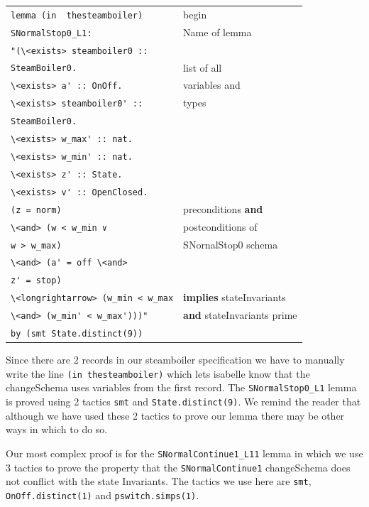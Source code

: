 \noindent \begin{tabular}{|l | l|}
\hline
\verb|lemma (in  thesteamboiler)| & {\color{red}begin} \\
\verb|SNormalStop0_L1:|& {\color{red}Name of lemma} \\
\verb|"(\<exists> steamboiler0 :: | & \\
\verb|SteamBoiler0.|&  {\color{red}list of all} \\
\verb|\<exists> a' :: OnOff.|&  {\color{red}variables and} \\
\verb|\<exists> steamboiler0' :: | & {\color{red}types} \\
\verb|SteamBoiler0.|&  \\
\verb|\<exists> w_max' :: nat.|&  \\
\verb|\<exists> w_min' :: nat.|&  \\
\verb|\<exists> z' :: State.|&  \\
\verb|\<exists> v' :: OpenClosed.|&  \\
\verb|(z = norm)|&  {\color{red}preconditions \textbf{and}}\\
\verb|\<and> (w < w_min ∨|& {\color{red}postconditions of} \\
\verb|w > w_max)|& {\color{red}SNornalStop0 schema} \\
\verb|\<and> (a' = off \<and>|&  \\
\verb|z' = stop)|&  \\
\verb|\<longrightarrow> (w_min < w_max|& {\color{red}\textbf{implies} stateInvariants} \\
\verb|\<and> (w_min' < w_max')))"|& {\color{red}\textbf{and} stateInvariants prime} \\
\verb|by (smt State.distinct(9))|&  \\
\hline
\end{tabular}

Since there are 2 records in our steamboiler specification we have to manually write the line \verb|(in thesteamboiler)| which lets isabelle know that the changeSchema uses variables from the first record. The \verb|SNormalStop0_L1| lemma is proved using 2 tactics \verb|smt| and \verb|State.distinct(9)|. We remind the reader that although we have used these 2 tactics to prove our lemma there may be other ways in which to do so. 

Our most complex proof is for the \verb|SNormalContinue1_L11| lemma in which we use 3 tactics to prove the property that the \verb|SNormalContinue1| changeSchema does not conflict with the state Invariants. The tactics we use here are \verb|smt|, \verb|OnOff.distinct(1)| and \verb|pswitch.simps(1)|.

